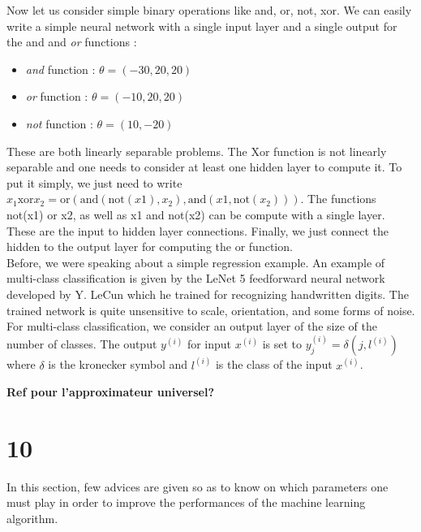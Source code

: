 \documentclass[10pt,a4paper]{article}
\begin{document}
Now let us consider simple binary operations like and, or, not, xor. We can
easily write a simple neural network with a single input layer and a
single output for the and and \emph{or} functions :
\begin{itemize}
\item \emph{and} function : $\theta =(-30, 20, 20)$
\item \emph{or} function : $\theta =(-10, 20, 20)$
\item \emph{not} function : $\theta =(10, -20)$
\end{itemize}
These are both linearly separable problems. The Xor function is not
linearly separable and one needs to consider at least one hidden layer
to compute it. To put it simply, we just need to write $x_1 \mbox{xor}
x_2 = \mbox{or}(\mbox{and}(\mbox{not}(x1),x_2),
\mbox{and}(x1,\mbox{not}(x_2)))$. The functions not(x1) or x2, as well
as x1 and not(x2) can be compute with a single layer. These are the
input to hidden layer connections. Finally, we just connect the hidden
to the output layer for computing the or function.\\

Before, we were speaking about a simple regression example. An example
of multi-class classification is given by the LeNet 5 feedforward
neural network developed by Y. LeCun which he trained for recognizing
handwritten digits. The trained network is quite unsensitive to scale,
orientation, and some forms of noise. For multi-class classification,
we consider an output layer of the size of the number of classes. The
output $y^{(i)}$ for input $x^{(i)}$ is set to $y^{(i)}_j = \delta(j,
l^{(i)})$ where $\delta$ is the kronecker symbol and $l^{(i)}$ is the
class of the input $x^{(i)}$.




\textbf{Ref pour l'approximateur universel?}

\section{10}

In this section, few advices are given so as to know on which parameters one must play in order to improve the performances of the machine learning algorithm.\\
\end{document}
